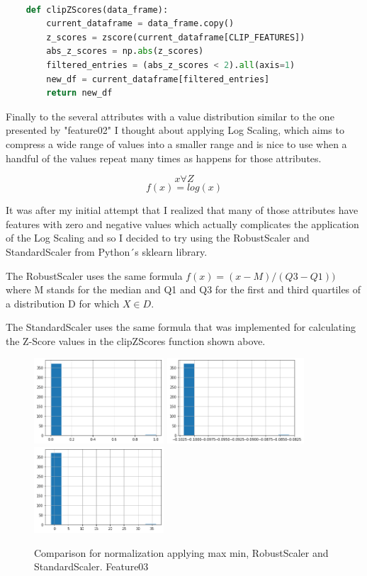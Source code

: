 \documentclass[12pt, a4paper]{article}
\begin{document}
	\begin{lstlisting}[language=Python]
		
	def clipZScores(data_frame):
		current_dataframe = data_frame.copy()
		z_scores = zscore(current_dataframe[CLIP_FEATURES])
		abs_z_scores = np.abs(z_scores)
		filtered_entries = (abs_z_scores < 2).all(axis=1)
		new_df = current_dataframe[filtered_entries]
		return new_df
	\end{lstlisting}

	Finally to the several attributes with a value distribution similar to the one presented by "feature02" I thought about applying Log Scaling, which aims to compress a wide range of values into a smaller range and is nice to use when a handful of the values repeat many times as happens for those attributes.\cite{normalizationTechniques}
	
	\[ x \forall Z \]
	\[ f(x) = log(x) \]
	
	It was after my initial attempt that I realized that many of those attributes have features with zero and negative values which actually complicates the application of the Log Scaling and so I decided to try using the RobustScaler and StandardScaler from Python´s sklearn library.
	
	The RobustScaler uses the same formula $f(x) = (x - M)/(Q3-Q1)) $ where M stands for the median and Q1 and Q3 for the first and third quartiles of a distribution D for which $X \in D$.\cite{normalizeSkLearn}
	
	The StandardScaler uses the same formula that was implemented for calculating the Z-Score values in the clipZScores function shown above.
	
	\begin{figure}[H]
		\label{Feature03Comparidson}
		\includegraphics[height=32mm]{img/plots/feature03N.png}
		\includegraphics[height=32mm]{img/plots/feature03NStandard.png}
		\includegraphics[height=32mm]{img/plots/feature03NRobust.png}
		\caption[width=50mm]{Comparison for normalization applying max min, RobustScaler and StandardScaler. Feature03}
	\end{figure}
\end{document}
